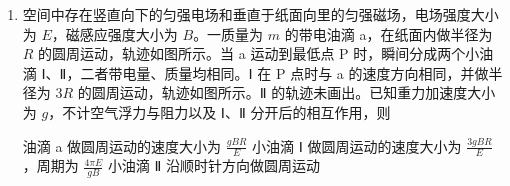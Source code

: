 \documentclass[\gkver]{gaokaozhenti}
\begin{document}
\begin{enumerate}
{B．在 $y$ 轴方向的加速度为

$a_{y} = \frac{mg\sin30^{\circ}}{m} = g\sin30^{\circ} = 5 \Umsq$

故 $t = 1 \Us$ 时，物块的 $y$ 坐标值为

$y = \frac{1}{2}a_{y}t^{2} = 2.5 \Um$

故 B 正确；

C．$t = 1 \Us$ 时，$F = 6 \UN$，故此时加速度大小为

$a = \sqrt{a_{x}^{2} + a_{y}^{2}} = \sqrt{\left(\frac{6}{1.2}\right)^{2} + 5^{2}} \Umsq = 5\sqrt{2} \Umsq$

故 C 错误；

D．对 $x$ 轴正方向，对物块根据动量定理

$Ft = mv_{x} - 0$

由于 $F$ 与时间 $t$ 成线性关系故可得

$\frac{(4 + 2 \times 0) + (4 + 2 \times 2)}{2} \times 2 = 1.2v_{x}$

解得 $v_{x} = 10 \Ums$

此时 $y$ 轴方向速度为

$v_{y} = g\sin30^{\circ} \cdot t = 5 \times 2 \Ums = 10 \Ums$

故此时物块的速度大小为 $v = \sqrt{v_{x}^{2} + v_{y}^{2}} = 10\sqrt{2} \Ums$

故 D 正确。

故选 BD。
}

\item
空间中存在竖直向下的匀强电场和垂直于纸面向里的匀强磁场，电场强度大小为 $E$，磁感应强度大小为 $B$。一质量为 $m$ 的带电油滴 a，在纸面内做半径为 $R$ 的圆周运动，轨迹如图所示。当 a 运动到最低点 P 时，瞬间分成两个小油滴 Ⅰ、Ⅱ，二者带电量、质量均相同。Ⅰ 在 P 点时与 a 的速度方向相同，并做半径为 $3R$ 的圆周运动，轨迹如图所示。Ⅱ 的轨迹未画出。已知重力加速度大小为 $g$，不计空气浮力与阻力以及 Ⅰ、Ⅱ 分开后的相互作用，则


{油滴 a 做圆周运动的速度大小为 $\frac{gBR}{E}$}
{小油滴 Ⅰ 做圆周运动的速度大小为 $\frac{3gBR}{E}$，周期为 $\frac{4\pi E}{gB}$}
{小油滴 Ⅱ 沿顺时针方向做圆周运动}

\end{enumerate}
\end{document}
